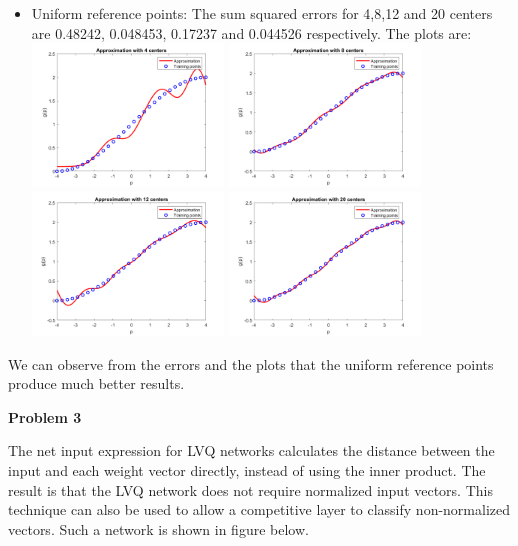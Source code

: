 \documentclass{article}
\begin{document}
\begin{itemize}
	\item Uniform reference points: 
	The sum squared errors for 4,8,12 and 20 centers are 0.48242, 0.048453, 0.17237 and 0.044526 respectively. The plots are: \\
	\includegraphics[width=0.4\textwidth]{Problem2_4_uniform.png}
	\includegraphics[width=0.4\textwidth]{Problem2_8_uniform.png} \\
	\includegraphics[width=0.4\textwidth]{Problem2_12_uniform.png}
	\includegraphics[width=0.4\textwidth]{Problem2_20_uniform.png}
\end{itemize}

We can observe from the errors and the plots that the uniform reference points produce much better results.


\newpage
\noindent \textbf{Problem 3}

\noindent The net input expression for LVQ networks calculates the distance between the input 
and each weight vector directly, instead of using the inner product. The result is that the 
LVQ network does not require normalized input vectors. This technique can also be 
used to allow a competitive layer to classify non-normalized vectors. Such a network is 
shown in figure below.
\end{document}
